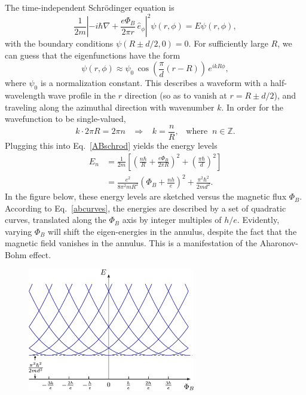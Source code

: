 \documentclass[pra,12pt]{revtex4}
\begin{document}
The time-independent Schr\"odinger equation is
\begin{equation}
  \frac{1}{2m}\left|-i\hbar\nabla+
  \frac{e\Phi_B}{2\pi r} \, \hat{e}_\phi\right|^2 \psi(r,\phi)
  = E\psi(r,\phi),
  \label{ABschrod}
\end{equation}
with the boundary conditions $\psi(R\pm d/2,0) = 0$.  For sufficiently
large $R$, we can guess that the eigenfunctions have the form
\begin{equation}
  \psi(r,\phi) \approx
  \psi_0 \, \cos\left(\frac{\pi}{d}(r-R)\right)\, e^{i k R \phi},
\end{equation}
where $\psi_0$ is a normalization constant.  This describes a waveform
with a half-wavelength wave profile in the $r$ direction (so as to
vanish at $r = R \pm d/2$), and traveling along the azimuthal
direction with wavenumber $k$.  In order for the wavefunction to be
single-valued,
\begin{equation}
  k \cdot 2\pi R = 2\pi n \;\;\;\Rightarrow \;\;\; k = \frac{n}{R},
  \;\;\;\mathrm{where}\;\; n \in \mathbb{Z}.
\end{equation}
Plugging this into Eq.~\eqref{ABschrod} yields the energy levels
\begin{align}
  E_n &= \frac{1}{2m} \left[
    \left(\frac{n\hbar}{R} + \frac{e\Phi_B}{2\pi R}\right)^2
    + \left(\frac{\pi\hbar}{d}\right)^2 \right] \\
  &= \frac{e^2}{8\pi^2mR^2} \left(\Phi_B + \frac{nh}{e} \right)^2
  + \frac{\pi^2\hbar^2}{2md^2}.
  \label{abcurves}
\end{align}
In the figure below, these energy levels are sketched versus the
magnetic flux $\Phi_B$.  According to Eq.~\eqref{abcurves}, the
energies are described by a set of quadratic curves, translated along
the $\Phi_B$ axis by integer multiples of $h/e$.  Evidently, varying
$\Phi_B$ will shift the eigen-energies in the annulus, despite the
fact that the magnetic field vanishes in the annulus.  This is a
manifestation of the Aharonov-Bohm effect.

\begin{figure}[h]
  \centering\includegraphics[width=0.65\textwidth]{abring}
\end{figure}
\end{document}
